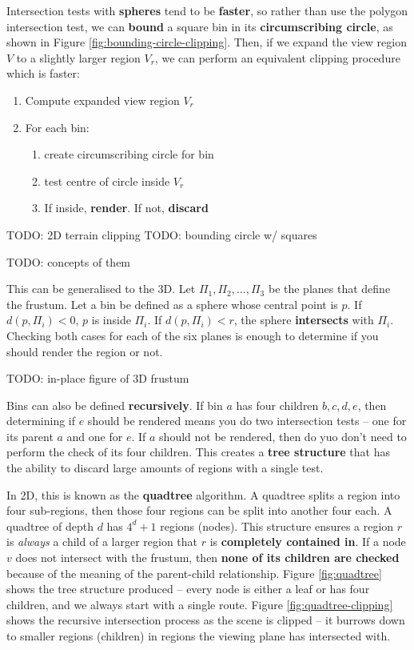 \documentclass{article}
\begin{document}
Intersection tests with \textbf{spheres} tend to be \textbf{faster}, so rather than use the polygon intersection test, we can \textbf{bound} a square bin in its \textbf{circumscribing circle}, as shown in Figure \ref{fig:bounding-circle-clipping}. Then, if we expand the view region $V$ to a slightly larger region $V_r$, we can perform an equivalent clipping procedure which is faster:
\begin{enumerate}
	\item Compute expanded view region $V_r$
	\item For each bin:
	\begin{enumerate}
		\item create circumscribing circle for bin
		\item test centre of circle inside $V_r$
		\item If inside, \textbf{render}. If not, \textbf{discard}
	\end{enumerate}
\end{enumerate}

TODO: 2D terrain clipping
TODO: bounding circle w/ squares

TODO: concepts of them

This can be generalised to the 3D. Let $\Pi_1, \Pi_2, ..., \Pi_3$ be the planes that define the frustum. Let a bin be defined as a sphere whose central point is $p$. If $d(p, \Pi_i) < 0$, $p$ is inside $\Pi_i$. If $d(p, \Pi_i) < r$, the sphere \textbf{intersects} with $\Pi_i$. Checking both cases for each of the six planes is enough to determine if you should render the region or not.

TODO: in-place figure of 3D frustum

Bins can also be defined \textbf{recursively}. If bin $a$ has four children $b, c, d, e$, then determining if $e$ should be rendered means you do two intersection tests -- one for its parent $a$ and one for $e$. If $a$ should not be rendered, then do yuo don't need to perform the check of its four children. This creates a \textbf{tree structure} that has the ability to discard large amounts of regions with a single test.

In 2D, this is known as the \textbf{quadtree} algorithm. A quadtree splits a region into four sub-regions, then those four regions can be split into another four each. A quadtree of depth $d$ has $4^d + 1$ regions (nodes). This structure ensures a region $r$ is \textit{always} a child of a larger region that $r$ is \textbf{completely contained in}. If a node $v$ does not intersect with the frustum, then \textbf{none of its children are checked} because of the meaning of the parent-child relationship. Figure \ref{fig:quadtree} shows the tree structure produced -- every node is either a leaf or has four children, and we always start with a single route. Figure \ref{fig:quadtree-clipping} shows the recursive intersection process as the scene is clipped -- it burrows down to smaller regions (children) in regions the viewing plane has intersected with.
\end{document}

